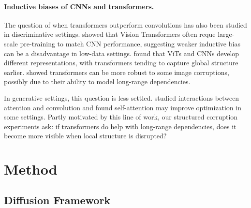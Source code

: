 \documentclass{article}
\begin{document}
\paragraph{Inductive biases of CNNs and transformers.}
The question of when transformers outperform convolutions has also been studied in discriminative settings.
\citet{dosovitskiy2021vit} showed that Vision Transformers often reque large-scale pre-training to match CNN performance, suggesting weaker inductive bias can be a disadvantage in low-data settings.
\citet{raghu2021vision} found that ViTs and CNNs develop different representations, with transformers tending to capture global structure earlier.
\citet{naseer2021intriguing} showed transformers can be more robust to some image corruptions, possibly due to their ability to model long-range dependencies. 

In generative settings, this question is less settled. \citet{park2022visiontransformer} studied interactions between attention and convolution and found self-attention may improve optimization in some settings.
Partly motivated by this line of work, our structured corruption experiments ask: if transformers do help with long-range dependencies, does it become more visible when local structure is disrupted?

\section{Method}
\label{sec:method}

\subsection{Diffusion Framework}
\end{document}

